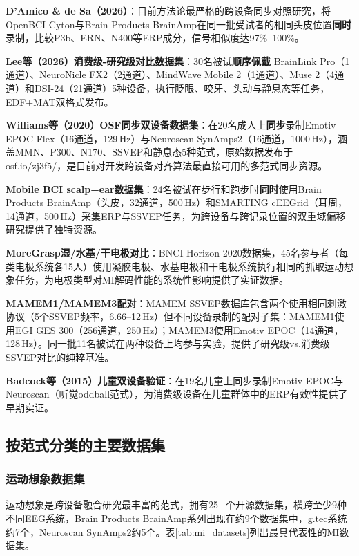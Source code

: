 \documentclass[12pt, a4paper]{article}
\begin{document}
\textbf{D'Amico \& de Sa（2026）}：目前方法论最严格的跨设备同步对照研究\citep{DAmico2026}，将OpenBCI Cyton与Brain Products BrainAmp在同一批受试者的相同头皮位置\textbf{同时}录制，比较P3b、ERN、N400等ERP成分，信号相似度达97\%--100\%。

\textbf{Lee等（2026）消费级-研究级对比数据集}\citep{Lee2026dataset}：30名被试\textbf{顺序佩戴} BrainLink Pro（1通道）、NeuroNicle FX2（2通道）、MindWave Mobile 2（1通道）、Muse 2（4通道）和DSI-24（21通道）5种设备，执行眨眼、咬牙、头动与静息态等任务，EDF+MAT双格式发布。

\textbf{Williams等（2020）OSF同步双设备数据集}\citep{Williams2020PeerJ}：在20名成人上\textbf{同步}录制Emotiv EPOC Flex（16通道，129\,Hz）与Neuroscan SynAmps2（16通道，1000\,Hz），涵盖MMN、P300、N170、SSVEP和静息态5种范式，原始数据发布于osf.io/zj3f5/，是目前对开发跨设备对齐算法最直接可用的多范式同步资源。

\textbf{Mobile BCI scalp+ear数据集}\citep{MobileBCI2021}：24名被试在步行和跑步时\textbf{同时}使用Brain Products BrainAmp（头皮，32通道，500\,Hz）和SMARTING cEEGrid（耳周，14通道，500\,Hz）采集ERP与SSVEP任务，为跨设备与跨记录位置的双重域偏移研究提供了独特资源。

\textbf{MoreGrasp湿/水基/干电极对比}\citep{Schwarz2020MoreGrasp}：BNCI Horizon 2020数据集，45名参与者（每类电极系统各15人）使用凝胶电极、水基电极和干电极系统执行相同的抓取运动想象任务，为电极类型对MI解码性能的系统性影响提供了实证数据。

\textbf{MAMEM1/MAMEM3配对}：MAMEM SSVEP数据库\citep{MAMEM2016}包含两个使用相同刺激协议（5个SSVEP频率，6.66--12\,Hz）但不同设备录制的配对子集：MAMEM1使用EGI GES 300（256通道，250\,Hz）；MAMEM3使用Emotiv EPOC（14通道，128\,Hz）。同一批11名被试在两种设备上均参与实验，提供了研究级vs.消费级SSVEP对比的纯粹基准。

\textbf{Badcock等（2015）儿童双设备验证}\citep{Badcock2015}：在19名儿童上同步录制Emotiv EPOC与Neuroscan（听觉oddball范式），为消费级设备在儿童群体中的ERP有效性提供了早期实证。

\subsection{按范式分类的主要数据集}

\subsubsection{运动想象数据集}

运动想象是跨设备融合研究最丰富的范式，拥有25+个开源数据集，横跨至少9种不同EEG系统，Brain Products BrainAmp系列出现在约9个数据集中，g.tec系统约7个，Neuroscan SynAmps2约5个。表\ref{tab:mi_datasets}列出最具代表性的MI数据集。
\end{document}
